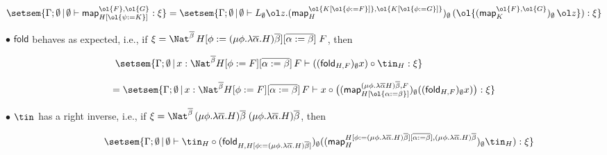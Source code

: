 \documentclass{lmcs}
\theoremstyle{plain}\newtheorem{satz}[thm]{Satz}
\newcommand{\fold}{\mathsf{fold}}
\newcommand{\map}{\mathsf{map}}
\begin{document}
\vspace*{-0.08in}

\[\setsem{\Gamma; \emptyset \,|\, \emptyset \vdash
\map_{H[\ol{\psi := K}]}^{\ol{F}, \ol{G}} : \xi} = \setsem{\Gamma;
  \emptyset \,|\, \emptyset \vdash L_\emptyset \ol
  z. (\map_H^{\ol{K[\ol{\phi := F}]}, \ol{K[\ol{\phi :=
          G}]}})_\emptyset \,(\ol{(\map_K^{\ol{F}, \ol{G}})_\emptyset
    \, \ol z}) : \xi}\]

\vspace*{0.1in}

\noindent
$\bullet$\; $\fold$ behaves as expected, i.e., if $\xi =
\Nat^{\overline{\beta}}\, H[\phi :=
  (\mu \phi. \lambda
  \overline{\alpha}. H)\overline{\beta}][\overline{\alpha := \beta}]\;
F$, then

\vspace*{-0.05in}

\[\hspace*{-1in}\setsem{\Gamma; \emptyset \,|\, x:
  \Nat^{\overline{\beta}} H[\phi :=
    F][\overline{\alpha := \beta}]\, F \vdash ((\fold_{H,
    F})_{\emptyset} x) \circ \tin_{H} : \xi}\]

\vspace*{-0.15in}

\[= \setsem{ \Gamma; \emptyset \,|\, x: \Nat^{\overline{\beta}} H[\phi
    := F][\overline{\alpha := \beta}]\, F 
  \vdash x \circ \big( (\map_{H [\ol{\alpha := \beta}]}^{(\mu
    \phi. \lambda \overline{\alpha} H) \overline{\beta},
    F})_\emptyset ((\fold_{H, F})_{\emptyset} x) \big) : \xi}\]

\vspace*{0.1in}

\noindent
$\bullet$\; $\tin$ has a right inverse, i.e., if $\xi =
\Nat^{\overline{\beta}}\, (\mu \phi. \lambda
\overline{\alpha}. H)\overline{\beta}\; (\mu \phi. \lambda
\overline{\alpha}. H)\overline{\beta}$, then

\vspace*{-0.05in}

\[\hspace*{0.43in}\setsem{\Gamma; \emptyset \,|\, \emptyset
  \vdash \tin_H \circ (\fold_{H, H[\phi := (\mu \phi. \lambda
      \overline{\alpha}. H)\overline{\beta}]})_{\emptyset}
  ((\map_{H}^{H[\phi := (\mu \phi. \lambda
      \overline{\alpha}. H)\overline{\beta}][\overline{\alpha :=
        \beta}], (\mu \phi. \lambda
    \overline{\alpha}. H)\overline{\beta}})_\emptyset \tin_H) :
  \xi}\]

\vspace*{-0.15in}
\end{document}

